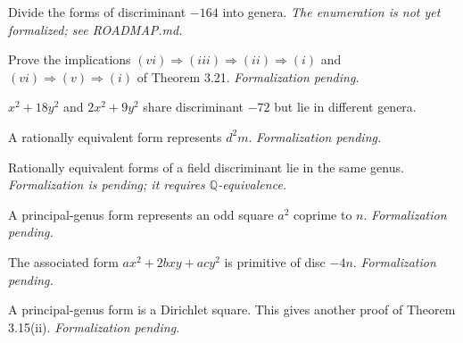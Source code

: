 \begin{theorem}[Exercise 3.14]
  \label{exr:s3_14}
  \notready
  Divide the forms of discriminant $-164$ into genera. \emph{The enumeration is not yet
  formalized; see ROADMAP.md.}
\end{theorem}

\begin{theorem}[Exercise 3.15]
  \label{exr:s3_15}
  \notready
  Prove the implications $(vi)\Rightarrow(iii)\Rightarrow(ii)\Rightarrow(i)$ and
  $(vi)\Rightarrow(v)\Rightarrow(i)$ of Theorem 3.21. \emph{Formalization pending.}
\end{theorem}

\begin{theorem}[Exercise 3.16]
  \label{exr:s3_16}
  \leanok
  $x^2+18y^2$ and $2x^2+9y^2$ share discriminant $-72$ but lie in different genera.
\end{theorem}

\begin{theorem}[Exercise 3.17(a)]
  \label{exr:s3_17_a}
  \notready
  A rationally equivalent form represents $d^2m$. \emph{Formalization pending.}
\end{theorem}

\begin{theorem}[Exercise 3.17(b)]
  \label{exr:s3_17_b}
  \notready
  Rationally equivalent forms of a field discriminant lie in the same genus.
  \emph{Formalization is pending; it requires $\mathbb Q$-equivalence.}
\end{theorem}

\begin{theorem}[Exercise 3.18(a)]
  \label{exr:s3_18_a}
  \notready
  A principal-genus form represents an odd square $a^2$ coprime to $n$.
  \emph{Formalization pending.}
\end{theorem}

\begin{theorem}[Exercise 3.18(b)]
  \label{exr:s3_18_b}
  \notready
  The associated form $ax^2+2bxy+acy^2$ is primitive of disc $-4n$. \emph{Formalization pending.}
\end{theorem}

\begin{theorem}[Exercise 3.18(c)]
  \label{exr:s3_18_c}
  \notready
  A principal-genus form is a Dirichlet square. This gives another proof of Theorem 3.15(ii).
  \emph{Formalization pending.}
\end{theorem}

